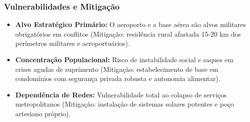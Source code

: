 \subsubsection{Vulnerabilidades e
Mitigação}

\begin{itemize}
\tightlist
\item
  \textbf{Alvo Estratégico Primário:} O aeroporto e a base aérea são
  alvos militares obrigatórios em conflitos (Mitigação: residência rural
  afastada 15-20 km dos perímetros militares e aeroportuários).
\item
  \textbf{Concentração Populacional:} Risco de instabilidade social e
  saques em crises agudas de suprimento (Mitigação: estabelecimento de
  base em condomínios com segurança privada robusta e autonomia
  alimentar).
\item
  \textbf{Dependência de Redes:} Vulnerabilidade total ao colapso de
  serviços metropolitanos (Mitigação: instalação de sistemas solares
  potentes e poço artesiano próprio).
\end{itemize}

